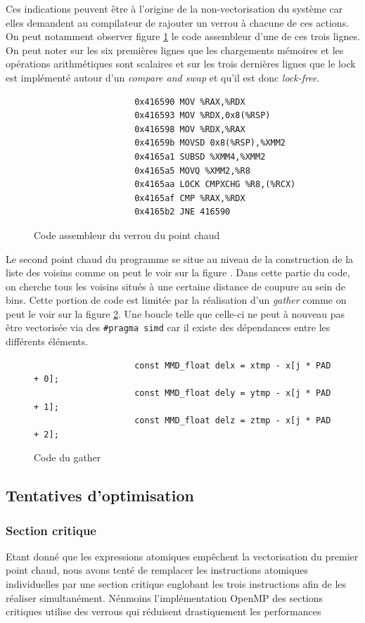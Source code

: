 \documentclass[11pt,a4paper]{article}
\begin{document}
			Ces indications peuvent être à l'origine de la non-vectorisation du système car elles demandent au compilateur de rajouter un verrou à chacune de ces actions. On peut notamment observer figure \ref{code:hotspot_lock} le code assembleur d'une de ces trois lignes. On peut noter sur les six premières lignes que les chargements mémoires et les opérations arithmétiques sont scalaires et sur les trois dernières lignes que le lock est implémenté autour d'un \textit{compare and swap} et qu'il est donc \textit{lock-free}.

			\begin{figure}[h!]
				\centering
				\begin{verbatim}
					0x416590 MOV %RAX,%RDX
					0x416593 MOV %RDX,0x8(%RSP)
					0x416598 MOV %RDX,%RAX
					0x41659b MOVSD 0x8(%RSP),%XMM2
					0x4165a1 SUBSD %XMM4,%XMM2
					0x4165a5 MOVQ %XMM2,%R8
					0x4165aa LOCK CMPXCHG %R8,(%RCX)
					0x4165af CMP %RAX,%RDX
					0x4165b2 JNE 416590
				\end{verbatim}
				\caption{Code assembleur du verrou du point chaud}
				\label{code:hotspot_lock}
			\end{figure}

			Le second point chaud du programme se situe au niveau de la construction de la liste des voisins comme on peut le voir sur la figure \label{loop_maqao}. Dans cette partie du code, on cherche tous les voisins situés à une certaine distance de coupure au sein de bins. Cette portion de code est limitée par la réalisation d'un \textit{gather} comme on peut le voir sur la figure \ref{code:hotspot_gather}. Une boucle telle que celle-ci ne peut à nouveau pas être vectorisée via des \verb!#pragma simd! car il existe des dépendances entre les différents éléments.

			\begin{figure}[h!]
				\centering
				\begin{verbatim}
					const MMD_float delx = xtmp - x[j * PAD + 0];
					const MMD_float dely = ytmp - x[j * PAD + 1];
					const MMD_float delz = ztmp - x[j * PAD + 2];
	            \end{verbatim}
            	\caption{Code du gather}
				\label{code:hotspot_gather}
	        \end{figure}
		\subsection{Tentatives d'optimisation}
			\subsubsection{Section critique}
				Etant donné que les expressions atomiques empêchent la vectorisation du premier point chaud, nous avons tenté de remplacer les instructions atomiques individuelles par une section critique englobant les trois instructions afin de les réaliser simultanément. Nénmoins l'implémentation OpenMP des sections critiques utilise des verrous qui réduisent drastiquement les performances
\end{document}
